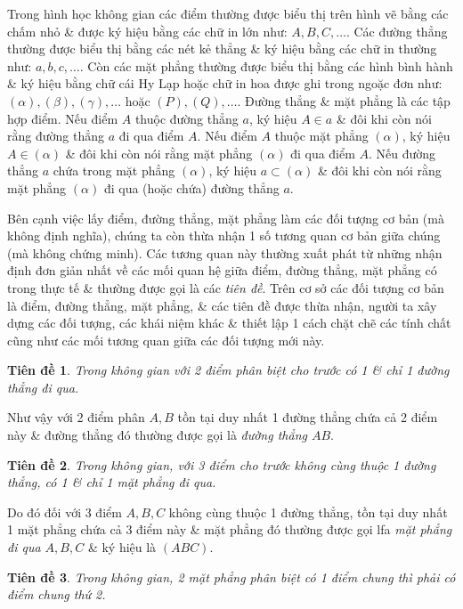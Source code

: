 \documentclass[oneside]{book}
\numberwithin{equation}{section}
\newtheorem{tiende}{Tiên đề}[section]
\begin{document}
Trong hình học không gian các điểm thường được biểu thị trên hình vẽ bằng các chấm nhỏ \& được ký hiệu bằng các chữ in lớn như: $A,B,C,\ldots$. Các đường thẳng thường được biểu thị bằng các nét kẻ thẳng \& ký hiệu bằng các chữ in thường như: $a,b,c,\ldots$. Còn các mặt phẳng thường được biểu thị bằng các hình bình hành \& ký hiệu bằng chữ cái Hy Lạp hoặc chữ in hoa được ghi trong ngoặc đơn như: $(\alpha),(\beta),(\gamma),\ldots$ hoặc $(P),(Q),\ldots$. Đường thẳng \& mặt phẳng là các tập hợp điểm. Nếu điểm $A$ thuộc đường thẳng $a$, ký hiệu $A\in a$ \& đôi khi còn nói rằng đường thẳng $a$ đi qua điểm $A$. Nếu điểm $A$ thuộc mặt phẳng $(\alpha)$, ký hiệu $A\in(\alpha)$ \& đôi khi còn nói rằng mặt phẳng $(\alpha)$ đi qua điểm $A$. Nếu đường thẳng $a$ chứa trong mặt phẳng $(\alpha)$, ký hiệu $a\subset(\alpha)$ \& đôi khi còn nói rằng mặt phẳng $(\alpha)$ đi qua (hoặc chứa) đường thẳng $a$.

Bên cạnh việc lấy điểm, đường thẳng, mặt phẳng làm các đối tượng cơ bản (mà không định nghĩa), chúng ta còn thừa nhận 1 số tương quan cơ bản giữa chúng (mà không chứng minh). Các tương quan này thường xuất phát từ những nhận định đơn giản nhất về các mối quan hệ giữa điểm, đường thẳng, mặt phẳng có trong thực tế \& thường được gọi là các \textit{tiên đề}. Trên cơ sở các đối tượng cơ bản là điểm, đường thẳng, mặt phẳng, \& các tiên đề được thừa nhận, người ta xây dựng các đối tượng, các khái niệm khác \& thiết lập 1 cách chặt chẽ các tính chất cũng như các mối tương quan giữa các đối tượng mới này.

\begin{tiende}
	Trong không gian với 2 điểm phân biệt cho trước có 1 \& chỉ 1 đường thẳng đi qua.
\end{tiende}
Như vậy với 2 điểm phân $A,B$ tồn tại duy nhất 1 đường thẳng chứa cả 2 điểm này \& đường thẳng đó thường được gọi là \textit{đường thẳng $AB$}.

\begin{tiende}
	\label{TLCT Hinh Hoc 11 Tien de 2 p. 45}
	Trong không gian, với 3 điểm cho trước không cùng thuộc 1 đường thẳng, có 1 \& chỉ 1 mặt phẳng đi qua.
\end{tiende}
Do đó đối với 3 điểm $A,B,C$ không cùng thuộc 1 đường thẳng, tồn tại duy nhất 1 mặt phẳng chứa cả 3 điểm này \& mặt phẳng đó thường được gọi lfa \textit{mặt phẳng đi qua $A,B,C$} \& ký hiệu là $(ABC)$.

\begin{tiende}
	\label{TLCT Hinh Hoc 11 Tien de 3 p. 45}
	Trong không gian, 2 mặt phẳng phân biệt có 1 điểm chung thì phải có điểm chung thứ 2.
\end{tiende}
\end{document}
